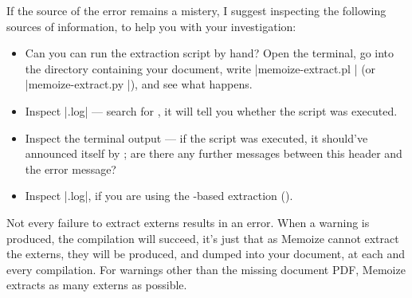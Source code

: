 \documentclass[a4paper,11pt]{article}
\begin{document}
\begin{enumerate}
  If the source of the error remains a mistery, I suggest inspecting the
  following sources of information, to help you with your investigation:
  \begin{itemize}
  \item Can you can run the extraction script by hand?  Open the terminal, go
    into the directory containing your document, write |memoize-extract.pl
    | (or |memoize-extract.py |), and
    see what happens.
  \item Inspect |.log| --- search for
    , it will tell you whether the
    script was executed.
  \item Inspect the  terminal output --- if the script was
    executed, it should've announced itself by ; are there any further messages between this header
    and the error message?
  \item Inspect |.log|, if you are using the
    -based extraction
    ().
  \end{itemize}
  
\end{enumerate}

Not every failure to extract externs results in an error.  When a warning is
produced, the compilation will succeed, it's just that as Memoize cannot
extract the externs, they will be produced, and dumped into your document, at
each and every compilation.  For warnings other than the missing document PDF,
Memoize extracts as many externs as possible.
\end{document}

